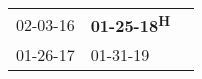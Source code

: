 \begin{supertabular}{lll}
 02-03-16\textsuperscript{} &  \textbf{01-25-18\textsuperscript{H}} \\
 01-26-17\textsuperscript{} &            01-31-19\textsuperscript{} \\
\end{supertabular}

